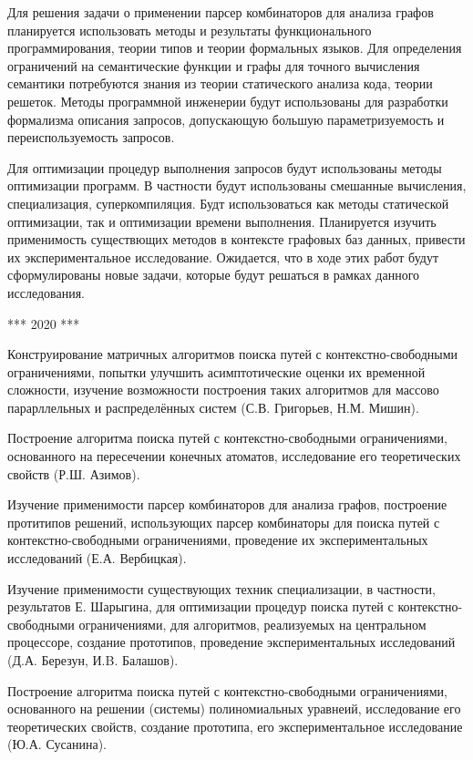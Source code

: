\documentclass[12pt]{article}  %
\theoremstyle{remark}
\begin{document}
Для решения задачи о применении парсер комбинаторов для анализа графов планируется использовать методы и результаты функционального программирования, теории типов и теории формальных языков.
Для определения ограничений на семантические функции и графы для точного вычисления семантики потребуются знания из теории статического анализа кода, теории решеток.
Методы программной инженерии будут использованы для разработки формализма описания запросов, допускающую большую параметризуемость и переиспользуемость запросов.

Для оптимизации процедур выполнения запросов будут использованы методы оптимизации программ. В частности будут использованы смешанные вычисления, специализация, суперкомпиляция. Будт использоваться как методы статической оптимизации, так и оптимизации времени выполнения. Планируется изучить применимость существющих методов в контексте графовых баз данных, привести их экспериментальное исследование. Ожидается, что в ходе этих работ будут сформулированы новые задачи, которые будут решаться в рамках данного исследования.

*** 2020 ***

Конструирование матричных алгоритмов поиска путей с контекстно-свободными ограничениями, попытки улучшить асимптотические оценки их временной сложности, изучение возможности построения таких алгоритмов для массово парарллельных и распределённых систем (С.В. Григорьев, Н.М. Мишин).

Построение алгоритма поиска путей с контекстно-свободными ограничениями, основанного на пересечении конечных атоматов, исследование его теоретических свойств (Р.Ш. Азимов).

Изучение применимости парсер комбинаторов для анализа графов, построение протитипов решений, использующих парсер комбинаторы для поиска путей с контекстно-свободными ограничениями, проведение их экспериментальных исследований (Е.А. Вербицкая).

Изучение применимости существующих техник специализации, в частности, результатов Е. Шарыгина, для оптимизации процедур поиска путей с контекстно-свободными ограничениями, для алгоритмов, реализуемых на центральном процессоре, создание прототипов, проведение экспериментальных исследований (Д.А. Березун, И.B. Балашов).

Построение алгоритма поиска путей с контекстно-свободными ограничениями, основанного на решении (системы) полиномиальных уравнеий, исследование его теоретических свойств, создание прототипа, его экспериментальное исследование (Ю.А. Сусанина).
\end{document}
